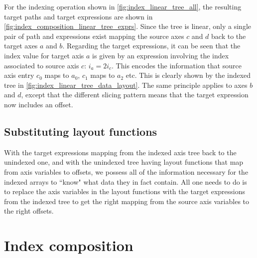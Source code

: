 \documentclass[thesis]{subfiles}
\begin{document}
For the indexing operation shown in \cref{fig:index_linear_tree_all}, the resulting target paths and target expressions are shown in \cref{fig:index_composition_linear_tree_exprs}.
Since the tree is linear, only a single pair of path and expressions exist mapping the source axes $c$ and $d$ back to the target axes $a$ and $b$.
Regarding the target expressions, it can be seen that the index value for target axis $a$ is given by an expression involving the index associated to source axis $c$: $i_a = 2 i_c$.
This encodes the information that source axis entry $c_0$ maps to $a_0$, $c_1$ maps to $a_2$ etc.
This is clearly shown by the indexed tree in \cref{fig:index_linear_tree_data_layout}.
The same principle applies to axes $b$ and $d$, except that the different slicing pattern means that the target expression now includes an offset.


\subsection{Substituting layout functions}

With the target expressions mapping from the indexed axis tree back to the unindexed one, and with the unindexed tree having layout functions that map from axis variables to offsets, we possess all of the information necessary for the indexed arrays to ``know" what data they in fact contain.
All one needs to do is to replace the axis variables in the layout functions with the target expressions from the indexed tree to get the right mapping from the source axis variables to the right offsets.

\section{Index composition}
\label{sec:index_composition}
\end{document}
